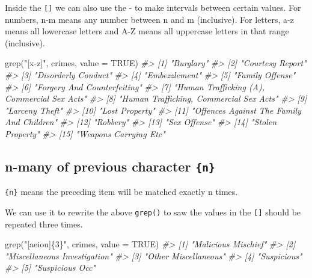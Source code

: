 \documentclass[
]{krantz}
\makeatletter
\newenvironment{Shaded}{\begin{snugshade}}{\end{snugshade}}
\newcommand{\AttributeTok}[1]{\textcolor[rgb]{0.61,0.61,0.61}{#1}}
\newcommand{\CommentTok}[1]{\textcolor[rgb]{0.37,0.37,0.37}{\textit{#1}}}
\newcommand{\ConstantTok}[1]{\textcolor[rgb]{0,0,0}{#1}}
\newcommand{\FunctionTok}[1]{\textcolor[rgb]{0,0,0}{#1}}
\newcommand{\NormalTok}[1]{#1}
\newcommand{\StringTok}[1]{\textcolor[rgb]{0.5,0.5,0.5}{#1}}
\newenvironment{kframe}{%
\medskip{}
\setlength{\fboxsep}{.8em}
 \def\at@end@of@kframe{}%
 \ifinner\ifhmode%
  \def\at@end@of@kframe{\end{minipage}}%
  \begin{minipage}{\columnwidth}%
 \fi\fi%
 \def\FrameCommand##1{\hskip\@totalleftmargin \hskip-\fboxsep
 \colorbox{shadecolor}{##1}\hskip-\fboxsep
     \hskip-\linewidth \hskip-\@totalleftmargin \hskip\columnwidth}%
 \MakeFramed {\advance\hsize-\width
   \@totalleftmargin\z@ \linewidth\hsize
   \@setminipage}}%
 {\par\unskip\endMakeFramed%
 \at@end@of@kframe}
\renewenvironment{Shaded}{\begin{kframe}}{\end{kframe}}
\makeatother
\begin{document}
Inside the \texttt{{[}{]}} we can also use the - to make intervals between certain values. For numbers, n-m means any number between n and m (inclusive). For letters, a-z means all lowercase letters and A-Z means all uppercase letters in that range (inclusive).

\begin{Shaded}
\begin{Highlighting}[]
\FunctionTok{grep}\NormalTok{(}\StringTok{"[x{-}z]"}\NormalTok{, crimes, }\AttributeTok{value =} \ConstantTok{TRUE}\NormalTok{)}
\CommentTok{\#\textgreater{}  [1] "Burglary"                                  }
\CommentTok{\#\textgreater{}  [2] "Courtesy Report"                           }
\CommentTok{\#\textgreater{}  [3] "Disorderly Conduct"                        }
\CommentTok{\#\textgreater{}  [4] "Embezzlement"                              }
\CommentTok{\#\textgreater{}  [5] "Family Offense"                            }
\CommentTok{\#\textgreater{}  [6] "Forgery And Counterfeiting"                }
\CommentTok{\#\textgreater{}  [7] "Human Trafficking (A), Commercial Sex Acts"}
\CommentTok{\#\textgreater{}  [8] "Human Trafficking, Commercial Sex Acts"    }
\CommentTok{\#\textgreater{}  [9] "Larceny Theft"                             }
\CommentTok{\#\textgreater{} [10] "Lost Property"                             }
\CommentTok{\#\textgreater{} [11] "Offences Against The Family And Children"  }
\CommentTok{\#\textgreater{} [12] "Robbery"                                   }
\CommentTok{\#\textgreater{} [13] "Sex Offense"                               }
\CommentTok{\#\textgreater{} [14] "Stolen Property"                           }
\CommentTok{\#\textgreater{} [15] "Weapons Carrying Etc"}
\end{Highlighting}
\end{Shaded}

\hypertarget{n-many-of-previous-character-n}{%
\subsection{\texorpdfstring{n-many of previous character \texttt{\{n\}}}{n-many of previous character \{n\}}}\label{n-many-of-previous-character-n}}

\texttt{\{n\}} means the preceding item will be matched exactly n times.

We can use it to rewrite the above \texttt{grep()} to saw the values in the \texttt{{[}{]}} should be repeated three times.

\begin{Shaded}
\begin{Highlighting}[]
\FunctionTok{grep}\NormalTok{(}\StringTok{"[aeiou]\{3\}"}\NormalTok{, crimes, }\AttributeTok{value =} \ConstantTok{TRUE}\NormalTok{)}
\CommentTok{\#\textgreater{} [1] "Malicious Mischief"         }
\CommentTok{\#\textgreater{} [2] "Miscellaneous Investigation"}
\CommentTok{\#\textgreater{} [3] "Other Miscellaneous"        }
\CommentTok{\#\textgreater{} [4] "Suspicious"                 }
\CommentTok{\#\textgreater{} [5] "Suspicious Occ"}
\end{Highlighting}
\end{Shaded}
\end{document}
